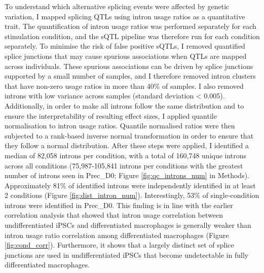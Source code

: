 To understand which alternative splicing events were affected by genetic variation, I mapped splicing QTLs using intron usage ratios as a quantitative trait. The quantification of intron usage ratios was performed separately for each stimulation condition, and the sQTL pipeline was therefore run for each condition separately. To minimise the risk of false positive sQTLs, I removed quantified splice junctions that may cause spurious associations when QTLs are mapped across individuals. These spurious associations can be driven by splice junctions supported by a small number of samples, and I therefore removed intron clusters that have non-zero usage ratios in more than 40\% of samples. I also removed introns with low variance across samples (standard deviation < 0.005). Additionally, in order to make all introns follow the same distribution and to ensure the interpretability of resulting effect sizes, I applied quantile normalisation to intron usage ratios. Quantile normalised ratios were then subjected to a rank-based inverse normal transformation in order to ensure that they follow a normal distribution. After these steps were applied, I identified a median of 82,058 introns per condition, with a total of 160,748 unique introns across all conditions (75,987-105,841 introns per conditions with the greatest  number of introns seen in Prec\_D0; Figure \ref{fig:qc_introns_num} in Methods). Approximately 81\% of identified introns were independently identified in at least 2 conditions (Figure \ref{fig:dist_intron_num}). Interestingly, 53\% of single-condition introns were identified in Prec\_D0. This finding is in line with the earlier correlation analysis that showed that intron usage correlation between undifferentiated iPSCs and differentiated macrophages is generally weaker than intron usage ratio correlation among differentiated macrophages (Figure \ref{fig:cond_corr}). Furthermore, it shows that a largely distinct set of splice junctions are used in undifferentiated iPSCs that become undetectable in fully differentiated macrophages. \\

